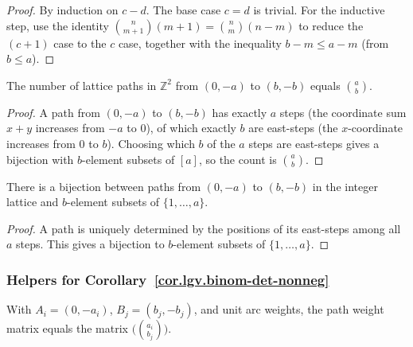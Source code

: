 \begin{proof}
\leanok
By induction on $c - d$.  The base case $c = d$ is trivial.
For the inductive step, use the identity
$\binom{n}{m+1}(m+1) = \binom{n}{m}(n - m)$ to reduce the $(c+1)$
case to the $c$ case, together with the inequality $b - m \le a - m$
(from $b \le a$).
\end{proof}

\begin{lemma}
\label{lem.lgv.paths-count-eq-choose}
\leanhelper
\leanok
The number of lattice paths in $\mathbb{Z}^2$ from $(0, -a)$ to
$(b, -b)$ equals $\binom{a}{b}$.
\end{lemma}

\begin{proof}
\leanok
A path from $(0,-a)$ to $(b,-b)$ has exactly $a$ steps (the coordinate
sum $x+y$ increases from $-a$ to $0$), of which exactly $b$ are
east-steps (the $x$-coordinate increases from $0$ to $b$).  Choosing
which $b$ of the $a$ steps are east-steps gives a bijection with
$b$-element subsets of $[a]$, so the count is $\binom{a}{b}$.
\end{proof}

\begin{lemma}
\label{lem.lgv.paths-equiv-powersetCard}
\leanhelper
\leanok
There is a bijection between paths from $(0, -a)$ to $(b, -b)$ in the
integer lattice and $b$-element subsets of $\{1, \ldots, a\}$.
\end{lemma}

\begin{proof}
\leanok
A path is uniquely determined by the positions of its east-steps among
all $a$ steps.  This gives a bijection to $b$-element subsets of
$\{1, \ldots, a\}$.
\end{proof}

\subsubsection{Helpers for Corollary~\ref{cor.lgv.binom-det-nonneg}}

\begin{lemma}
\label{lem.lgv.binom-matrix-eq}
\leanhelper
\leanok
With $A_i = (0, -a_i)$, $B_j = (b_j, -b_j)$, and unit arc weights, the
path weight matrix equals the matrix $\bigl(\binom{a_i}{b_j}\bigr)$.
\end{lemma}

